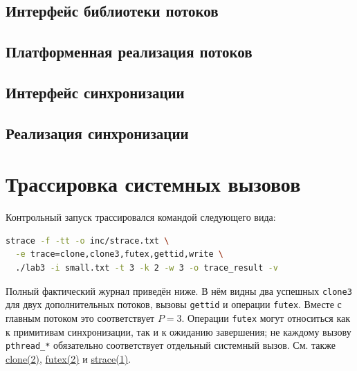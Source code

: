 \subsection{Интерфейс библиотеки потоков}


\subsection{Платформенная реализация потоков}


\subsection{Интерфейс синхронизации}


\subsection{Реализация синхронизации}


\section{Трассировка системных вызовов}
Контрольный запуск трассировался командой следующего вида:
\begin{lstlisting}[language=bash,numbers=none]
strace -f -tt -o inc/strace.txt \
  -e trace=clone,clone3,futex,gettid,write \
  ./lab3 -i small.txt -t 3 -k 2 -w 3 -o trace_result -v
\end{lstlisting}
Полный фактический журнал приведён ниже.
В нём видны два успешных \texttt{clone3} для двух дополнительных потоков,
вызовы \texttt{gettid} и операции \texttt{futex}.
Вместе с главным потоком это соответствует \(P=3\).
Операции \texttt{futex} могут относиться как к примитивам
синхронизации, так и к ожиданию завершения; не каждому вызову
\texttt{pthread\_*} обязательно соответствует отдельный системный вызов.
См. также
\href{https://man7.org/linux/man-pages/man2/clone.2.html}{clone(2)},
\href{https://man7.org/linux/man-pages/man2/futex.2.html}{futex(2)} и
\href{https://man7.org/linux/man-pages/man1/strace.1.html}{strace(1)}.


\clearpage
\endgroup
